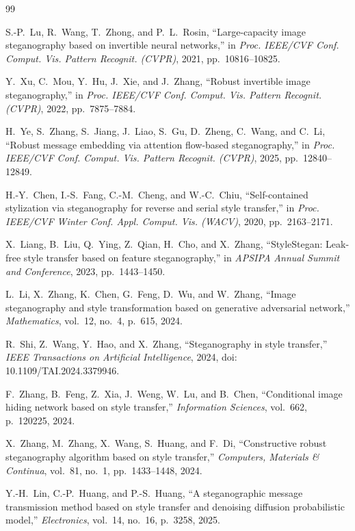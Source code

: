 \documentclass[conference]{IEEEtran}
\begin{document}
\begin{thebibliography}{99}

S.-P.\ Lu, R.\ Wang, T.\ Zhong, and P.~L.\ Rosin, ``Large-capacity image steganography based on invertible neural networks,'' in \emph{Proc. IEEE/CVF Conf. Comput. Vis. Pattern Recognit. (CVPR)}, 2021, pp.\ 10816--10825.

Y.\ Xu, C.\ Mou, Y.\ Hu, J.\ Xie, and J.\ Zhang, ``Robust invertible image steganography,'' in \emph{Proc. IEEE/CVF Conf. Comput. Vis. Pattern Recognit. (CVPR)}, 2022, pp.\ 7875--7884.

H.\ Ye, S.\ Zhang, S.\ Jiang, J.\ Liao, S.\ Gu, D.\ Zheng, C.\ Wang, and C.\ Li, ``Robust message embedding via attention flow-based steganography,'' in \emph{Proc. IEEE/CVF Conf. Comput. Vis. Pattern Recognit. (CVPR)}, 2025, pp.\ 12840--12849.

H.-Y.\ Chen, I.-S.\ Fang, C.-M.\ Cheng, and W.-C.\ Chiu, ``Self-contained stylization via steganography for reverse and serial style transfer,'' in \emph{Proc. IEEE/CVF Winter Conf. Appl. Comput. Vis. (WACV)}, 2020, pp.\ 2163--2171.

X.\ Liang, B.\ Liu, Q.\ Ying, Z.\ Qian, H.\ Cho, and X.\ Zhang, ``StyleStegan: Leak-free style transfer based on feature steganography,'' in \emph{APSIPA Annual Summit and Conference}, 2023, pp.\ 1443--1450.

L.\ Li, X.\ Zhang, K.\ Chen, G.\ Feng, D.\ Wu, and W.\ Zhang, ``Image steganography and style transformation based on generative adversarial network,'' \emph{Mathematics}, vol.\ 12, no.\ 4, p.\ 615, 2024.

R.\ Shi, Z.\ Wang, Y.\ Hao, and X.\ Zhang, ``Steganography in style transfer,'' \emph{IEEE Transactions on Artificial Intelligence}, 2024, doi: 10.1109/TAI.2024.3379946.

F.\ Zhang, B.\ Feng, Z.\ Xia, J.\ Weng, W.\ Lu, and B.\ Chen, ``Conditional image hiding network based on style transfer,'' \emph{Information Sciences}, vol.\ 662, p.\ 120225, 2024.

X.\ Zhang, M.\ Zhang, X.\ Wang, S.\ Huang, and F.\ Di, ``Constructive robust steganography algorithm based on style transfer,'' \emph{Computers, Materials \& Continua}, vol.\ 81, no.\ 1, pp.\ 1433--1448, 2024.

Y.-H.\ Lin, C.-P.\ Huang, and P.-S.\ Huang, ``A steganographic message transmission method based on style transfer and denoising diffusion probabilistic model,'' \emph{Electronics}, vol.\ 14, no.\ 16, p.\ 3258, 2025.


\end{thebibliography}
\end{document}
